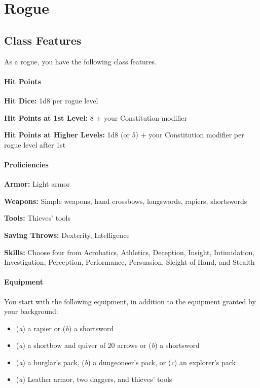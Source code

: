 \documentclass[
]{article}
\date{}
\providecommand{\tightlist}{%
  \setlength{\itemsep}{0pt}\setlength{\parskip}{0pt}}
\begin{document}
\hypertarget{rogue}{%
\section{Rogue}\label{rogue}}

\hypertarget{class-features}{%
\subsection{Class Features}\label{class-features}}

As a rogue, you have the following class features.

\hypertarget{hit-points}{%
\paragraph{Hit Points}\label{hit-points}}

\textbf{Hit Dice:} 1d8 per rogue level

\textbf{Hit Points at 1st Level:} 8 + your Constitution modifier

\textbf{Hit Points at Higher Levels:} 1d8 (or 5) + your Constitution
modifier per rogue level after 1st

\hypertarget{proficiencies}{%
\paragraph{Proficiencies}\label{proficiencies}}

\textbf{Armor:} Light armor

\textbf{Weapons:} Simple weapons, hand crossbows, longswords, rapiers,
shortswords

\textbf{Tools:} Thieves' tools

\textbf{Saving Throws:} Dexterity, Intelligence

\textbf{Skills:} Choose four from Acrobatics, Athletics, Deception,
Insight, Intimidation, Investigation, Perception, Performance,
Persuasion, Sleight of Hand, and Stealth

\hypertarget{equipment}{%
\paragraph{Equipment}\label{equipment}}

You start with the following equipment, in addition to the equipment
granted by your background:

\begin{itemize}
\tightlist
\item
  (\emph{a}) a rapier or (\emph{b}) a shortsword
\item
  (\emph{a}) a shortbow and quiver of 20 arrows or (\emph{b}) a
  shortsword
\item
  (\emph{a}) a burglar's pack, (\emph{b}) a dungeoneer's pack, or
  (\emph{c}) an explorer's pack
\item
  (\emph{a}) Leather armor, two daggers, and thieves' tools
\end{itemize}
\end{document}
